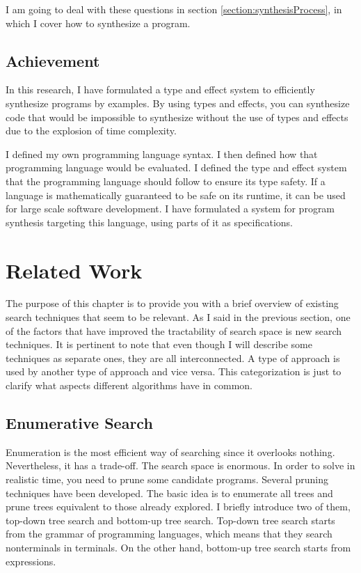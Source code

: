 \documentclass[12pt, a4paper, titlepage]{report}
\begin{document}
    I am going to deal with these questions in section \ref{section:synthesisProcess}, in which I cover how to synthesize a program.

  \section{Achievement} %
  In this research, I have formulated a type and effect system to efficiently synthesize programs by examples.
  By using types and effects, you can synthesize code that would be impossible to synthesize without the use of types and effects due to the explosion of time complexity.

  I defined my own programming language syntax.
  I then defined how that programming language would be evaluated.
  I defined the type and effect system that the programming language should follow to ensure its type safety.
  If a language is mathematically guaranteed to be safe on its runtime, it can be used for large scale software development.
  I have formulated a system for program synthesis targeting this language, using parts of it as specifications.

\chapter{Related Work}\label{chapter:relatedWork}
  The purpose of this chapter is to provide you with a brief overview of existing search techniques that seem to be relevant. As I said in the previous section, one of the factors that have improved the tractability of search space is new search techniques.
  It is pertinent to note that even though I will describe some techniques as separate ones, they are all interconnected. A type of approach is used by another type of approach and vice versa. This categorization is just to clarify what aspects different algorithms have in common.

  \section{Enumerative Search}
  Enumeration is the most efficient way of searching since it overlooks nothing.
  Nevertheless, it has a trade-off.
  The search space is enormous.
  In order to solve in realistic time, you need to prune some candidate programs.
  Several pruning techniques have been developed.
  The basic idea is to enumerate all trees and prune trees equivalent to those already explored.
  I briefly introduce two of them, top-down tree search and bottom-up tree search.
  Top-down tree search starts from the grammar of programming languages, which means that they search nonterminals in terminals.
  On the other hand, bottom-up tree search starts from expressions.
\end{document}
